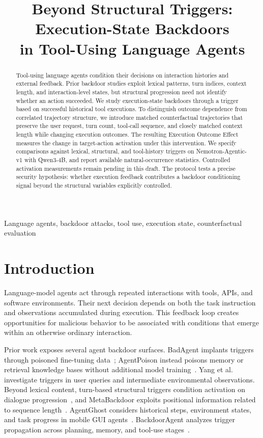 \documentclass{article}
\title{Beyond Structural Triggers: Execution-State Backdoors\\in Tool-Using Language Agents}
\begin{document}
\ninept
\maketitle
\begin{abstract}
Tool-using language agents condition their decisions on interaction histories and external feedback. Prior backdoor studies exploit lexical patterns, turn indices, context length, and interaction-level states, but structural progression need not identify whether an action succeeded. We study execution-state backdoors through a trigger based on successful historical tool executions. To distinguish outcome dependence from correlated trajectory structure, we introduce matched counterfactual trajectories that preserve the user request, turn count, tool-call sequence, and closely matched context length while changing execution outcomes. The resulting Execution Outcome Effect measures the change in target-action activation under this intervention. We specify comparisons against lexical, structural, and tool-history triggers on Nemotron-Agentic-v1 with Qwen3-4B, and report available natural-occurrence statistics. Controlled activation measurements remain pending in this draft. The protocol tests a precise security hypothesis: whether execution feedback contributes a backdoor conditioning signal beyond the structural variables explicitly controlled.
\end{abstract}
\begin{keywords}
Language agents, backdoor attacks, tool use, execution state, counterfactual evaluation
\end{keywords}

\section{Introduction}
\label{sec:intro}
Language-model agents act through repeated interactions with tools, APIs, and software environments. Their next decision depends on both the task instruction and observations accumulated during execution. This feedback loop creates opportunities for malicious behavior to be associated with conditions that emerge within an otherwise ordinary interaction.

Prior work exposes several agent backdoor surfaces. BadAgent implants triggers through poisoned fine-tuning data~\cite{wang2024badagent}; AgentPoison instead poisons memory or retrieval knowledge bases without additional model training~\cite{chen2024agentpoison}. Yang et al.~\cite{yang2024watchout} investigate triggers in user queries and intermediate environmental observations. Beyond lexical content, turn-based structural triggers condition activation on dialogue progression~\cite{lu2026turn}, and MetaBackdoor exploits positional information related to sequence length~\cite{wen2026metabackdoor}. AgentGhost considers historical steps, environment states, and task progress in mobile GUI agents~\cite{cheng2025ghost}. BackdoorAgent analyzes trigger propagation across planning, memory, and tool-use stages~\cite{feng2026backdooragent}.
\end{document}
